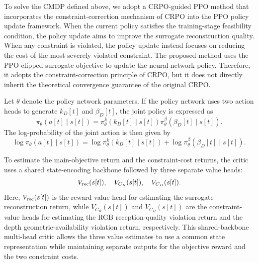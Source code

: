 \documentclass[journal]{IEEEtran}
\begin{document}
To solve the CMDP defined above, we adopt a CRPO-guided PPO method that incorporates the constraint-correction mechanism of CRPO into the PPO policy update framework. When the current policy satisfies the training-stage feasibility condition, the policy update aims to improve the surrogate reconstruction quality. When any constraint is violated, the policy update instead focuses on reducing the cost of the most severely violated constraint. The proposed method uses the PPO clipped surrogate objective to update the neural network policy. Therefore, it adopts the constraint-correction principle of CRPO, but it does not directly inherit the theoretical convergence guarantee of the original CRPO.

Let $\theta$ denote the policy network parameters. If the policy network uses two action heads to generate $k_D[t]$ and $\beta_D[t]$, the joint policy is expressed as
\begin{equation}
\pi_{\theta}
\left(
a[t]\mid s[t]
\right)
=
\pi_{\theta}^{k}
\left(
k_D[t]\mid s[t]
\right)
\pi_{\theta}^{\beta}
\left(
\beta_D[t]\mid s[t]
\right).
\end{equation}
The log-probability of the joint action is then given by
\begin{equation}
\log
\pi_{\theta}
\left(
a[t]\mid s[t]
\right)
=
\log
\pi_{\theta}^{k}
\left(
k_D[t]\mid s[t]
\right)
+
\log
\pi_{\theta}^{\beta}
\left(
\beta_D[t]\mid s[t]
\right).
\end{equation}

To estimate the main-objective return and the constraint-cost returns, the critic uses a shared state-encoding backbone followed by three separate value heads:
\begin{equation}
V_{\rm rec}(s[t]),\quad V_{C_R}(s[t]),\quad V_{C_D}(s[t]).
\end{equation}
Here, \(V_{\rm rec}(s[t])\) is the reward-value head for estimating the surrogate reconstruction return, while \(V_{C_R}(s[t])\) and \(V_{C_D}(s[t])\) are the constraint-value heads for estimating the RGB reception-quality violation return and the depth geometric-availability violation return, respectively.
This shared-backbone multi-head critic allows the three value estimates to use a common state representation while maintaining separate outputs for the objective reward and the two constraint costs.
\end{document}
